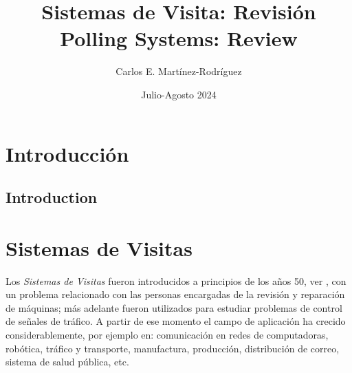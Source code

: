 \documentclass{article}
\title{Sistemas de Visita: Revisión\\
\small{Polling Systems: Review}}
\author{Carlos E. Martínez-Rodríguez}
\date{Julio-Agosto 2024}
\renewcommand{\abstractname}{Resumen}
\numberwithin{equation}{section}
\begin{document}
\maketitle

\begin{abstract}
\end{abstract}

\begin{otherlanguage}{english}
\renewcommand{\abstractname}{Abstract} %
\begin{abstract}
\end{abstract}
\end{otherlanguage}
\tableofcontents
\section*{Introducción}
\begin{otherlanguage}{english}
\section*{Introduction}
\end{otherlanguage}

\section{Sistemas de Visitas}

Los {\emph{Sistemas de Visitas}} fueron introducidos a principios de los a\~nos 50, ver \cite{Boxma,BoonMeiWinands,LevySidi,TesisRoubos,Takagi,Semenova}, con un problema relacionado con las personas encargadas de la revisi\'on y reparaci\'on de m\'aquinas; m\'as adelante fueron utilizados para estudiar problemas de control de se\~nales de tr\'afico. A partir de ese momento el campo de aplicaci\'on ha crecido considerablemente, por ejemplo en: comunicaci\'on en redes de computadoras, rob\'otica, tr\'afico y transporte, manufactura, producci\'on, distribuci\'on de correo, sistema de salud p\'ublica, etc.\\
\end{document}
